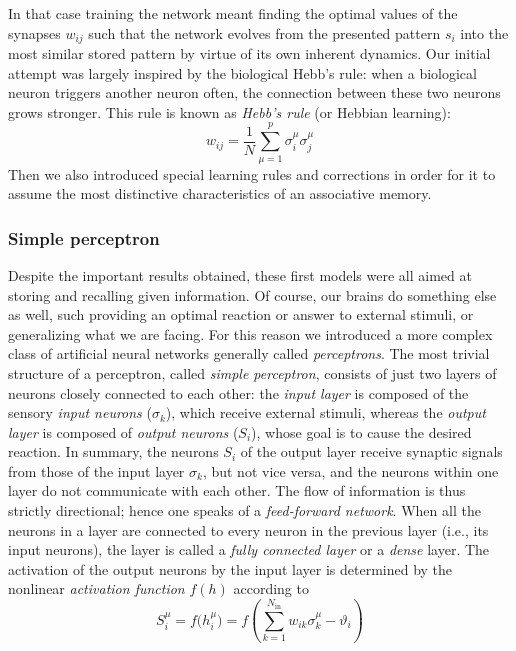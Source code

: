 In that case training the network meant finding the optimal values of the synapses $w_{ij}$ such that the network evolves from the presented pattern $s_i$ into the most similar stored pattern by virtue of its own inherent dynamics. Our initial attempt was largely inspired by the biological Hebb's rule: when a biological neuron triggers another neuron often, the connection between these two neurons grows stronger. This rule is known as \emph{Hebb's rule} (or Hebbian learning):
\begin{equation}
w_{ij}=\frac{1}{N}\sum_{\mu=1}^p\sigma_i^\mu\sigma_j^\mu
\end{equation}
Then we also introduced special learning rules and corrections in order for it to assume the most distinctive characteristics of an associative memory.

\subsubsection*{Simple perceptron}
Despite the important results obtained, these first models were all aimed at storing and recalling given information. Of course, our brains do something else as well, such providing an optimal reaction or answer to external stimuli, or generalizing what we are facing. For this reason we introduced a more complex class of artificial neural networks generally called \emph{perceptrons}. The most trivial structure of a perceptron, called \emph{simple perceptron}, consists of just two layers of neurons closely connected to each other: the \emph{input layer} is composed of the sensory \emph{input neurons} ($\sigma_k$), which receive external stimuli, whereas the \emph{output layer} is composed of \emph{output neurons} ($S_i$), whose goal is to cause the desired reaction. In summary, the neurons $S_i$ of the output layer receive synaptic signals from those of the input layer $\sigma_k$, but not vice versa, and the neurons within one layer do not communicate with each other. The flow of information is thus strictly directional; hence one speaks of a \emph{feed-forward network}. When all the neurons in a layer are connected to every neuron in the previous layer (i.e., its input neurons), the layer is called a \emph{fully connected layer} or a \emph{dense} layer. The activation of the output neurons by the input layer is determined by the nonlinear \emph{activation function} $f(h)$ according to
\begin{equation}\label{eq4:SimplePerceptron}
S_i^\mu=f\bigl(h_i^\mu\bigr)=f\!\left(\sum_{k=1}^{N_{\text{in}}}w_{ik}\sigma_k^\mu-\vartheta_i\right)
\end{equation}
